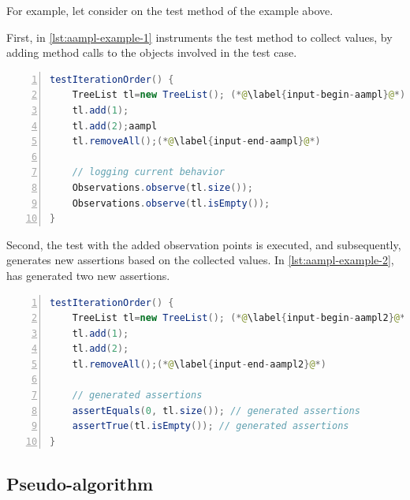 For example, let consider \Aampl on the test method of the example above. 

First, in \autoref{lst:aampl-example-1} \dspot instruments the test method to collect values, by adding method calls to the objects involved in the test case.

\begin{lstlisting}[caption={In \Aampl{}, the second step is to instrument and run the test to collect runtime values.},label=lst:aampl-example-1,float,language=java,numbers=left] 
testIterationOrder() {
	TreeList tl=new TreeList(); (*@\label{input-begin-aampl}@*)
	tl.add(1);
	tl.add(2);aampl
	tl.removeAll();(*@\label{input-end-aampl}@*)
	
	// logging current behavior
	Observations.observe(tl.size()); 
	Observations.observe(tl.isEmpty()); 
}
\end{lstlisting}

Second, the test with the added observation points is executed, and subsequently, \dspot generates new assertions based on the collected values. 
In \autoref{lst:aampl-example-2}, \dspot has generated two new assertions.

\begin{lstlisting}[caption={In \Aampl{}, the last step is to generate the assertions based on the collected values.},label=lst:aampl-example-2,float,language=java,numbers=left] 
testIterationOrder() {
	TreeList tl=new TreeList(); (*@\label{input-begin-aampl2}@*)
	tl.add(1);
	tl.add(2);
	tl.removeAll();(*@\label{input-end-aampl2}@*)
	
	// generated assertions
	assertEquals(0, tl.size()); // generated assertions
	assertTrue(tl.isEmpty()); // generated assertions
}
\end{lstlisting}

\subsection{Pseudo-algorithm}
\label{subsec:dspot:algorithm:pseudo-algo}

